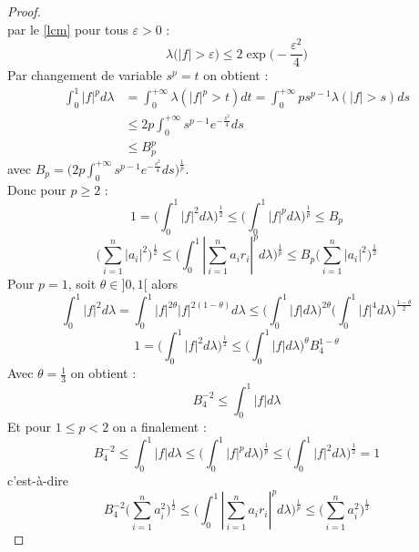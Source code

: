 \documentclass[12pt]{article}
\theoremstyle{definition}
\begin{document}
\begin{proof}
\begin{equation*}
	\end{equation*}
	par le \cref{lcm} pour tous $\varepsilon>0$ :
	\begin{equation*}
		\lambda\big(|f|>\varepsilon\big)\leq 2 \exp\big(-\frac{\varepsilon^2}{4}\big)
	\end{equation*}
	Par changement de variable $s^p=t$ on obtient :
	\begin{align*}
		\int_{0}^{1}|f|^p d\lambda &= \int_{0}^{+\infty}\lambda(|f|^p>t)dt = \int_{0}^{+\infty}p s^{p-1}\lambda(|f|>s)ds \\
		&\leq 2p\int_{0}^{+\infty}s^{p-1}e^{-\frac{s^2}{4}}ds\\
		&\leq B_p^p
	\end{align*}
	avec $B_p= \big(2p\int_{0}^{+\infty}s^{p-1}e^{-\frac{s^2}{4}}ds\big)^{\frac{1}{p}}$.\\
	Donc pour $p\geq 2$ : 
	\begin{equation*}
		1 =\big(\int_{0}^{1}|f|^2d\lambda\big)^{\frac{1}{2}}\leq \big(\int_{0}^{1}|f|^pd\lambda\big)^{\frac{1}{p}}\leq B_p
	\end{equation*}
	\begin{equation*}
		\big(\sum_{i=1}^{n}|a_i|^2\big)^{\frac{1}{2}} \leq \big(\int_{0}^{1}|\sum_{i=1}^{n}a_ir_i|^pd\lambda\big)^{\frac{1}{p}}\leq B_p\big(\sum_{i=1}^{n}|a_i|^2\big)^{\frac{1}{2}} 
	\end{equation*}
	Pour $p=1$, soit $\theta\in]0,1[$ alors 
	\begin{equation*}
		\int_{0}^{1}|f|^{2}d\lambda=\int_{0}^{1}|f|^{2\theta}|f|^{2(1-\theta)}d\lambda\leq\Bigg(\int_{0}^1 |f| d\lambda\Bigg)^{2\theta}\Bigg(\int_{0}^1|f|^{4}d\lambda\Bigg)^{\frac{1-\theta}{2}}
	\end{equation*}
	\begin{equation*}
		1 = \Bigg(\int_{0}^{1}|f|^{2}d\lambda\Bigg)^{\frac{1}{2}}\leq \Bigg(\int_{0}^1 |f| d\lambda\Bigg)^{\theta}B_4^{1-\theta}
	\end{equation*}
	Avec $\theta=\frac{1}{3}$ on obtient :
	\begin{equation*}
		B_4^{-2} \leq \int_{0}^1 |f| d\lambda
	\end{equation*}
	Et pour $1\leq p <2 $ on a finalement :
	\begin{equation*}
		B_4^{-2}\leq \int_{0}^1 |f| d\lambda \leq \Big(\int_0^1|f|^pd\lambda \Big)^{\frac{1}{p}}\leq \Big(\int_{0}^{1}|f|^{2}d\lambda\Big)^{\frac{1}{2}}=1
	\end{equation*}
	c'est-à-dire 
	\begin{equation*}
		B_4^{-2}\big(\sum_{i=1}^{n}a_i^2\big)^{\frac{1}{2}}\leq \Big(\int_0^1|\sum_{i=1}^{n}a_ir_i|^pd\lambda \Big)^{\frac{1}{p}}\leq \big(\sum_{i=1}^{n}a_i^2\big)^{\frac{1}{2}}
	\end{equation*}
	\end{proof}	
\nocite{GP}
\nocite{VM2}
\nocite{VMGS}
\printbibliography
\end{document}
